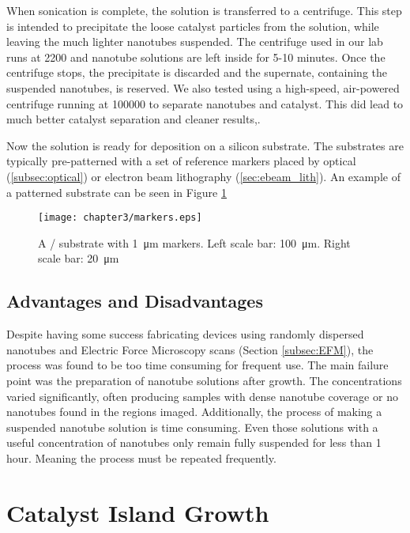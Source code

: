 When sonication is complete, the solution is transferred to a centrifuge. This step is intended to precipitate the loose catalyst particles from the solution, while leaving the much lighter nanotubes suspended. The centrifuge used in our lab runs at \SI{2200}{\rpm} and nanotube solutions are left inside for 5-10 minutes. Once the centrifuge stops, the precipitate is discarded and the supernate, containing the suspended nanotubes, is reserved. We also tested using a high-speed, air-powered centrifuge running at \SI{100000}{\rpm} to separate nanotubes and catalyst. This did lead to much better catalyst separation and cleaner results,.

Now the solution is ready for deposition on a silicon substrate. The substrates are typically pre-patterned with a set of reference markers placed by optical (\ref{subsec:optical}) or electron beam lithography (\ref{sec:ebeam_lith}). An example of a patterned substrate can be seen in Figure \ref{fig:markers}

\begin{figure}
    \centering
    \texttt{[image: chapter3/markers.eps]}
    \caption{A / substrate with \SI{1}{\micro\meter}  markers. Left scale bar: \SI{100}{\micro\meter}. Right scale bar: \SI{20}{\micro\meter} }
    \label{fig:markers}
\end{figure}

\subsection{Advantages and Disadvantages}

Despite having some success fabricating devices using randomly dispersed nanotubes and Electric Force Microscopy scans (Section \ref{subsec:EFM}), the process was found to be too time consuming for frequent use. The main failure point was the preparation of nanotube solutions after growth. The concentrations varied significantly, often producing samples with dense nanotube coverage or no nanotubes found in the regions imaged. Additionally, the process of making a suspended nanotube solution is time consuming. Even those solutions with a useful concentration of nanotubes only remain fully suspended for less than 1 hour. Meaning the process must be repeated frequently.

\section{Catalyst Island Growth}
\label{sec:catalyst_island}

